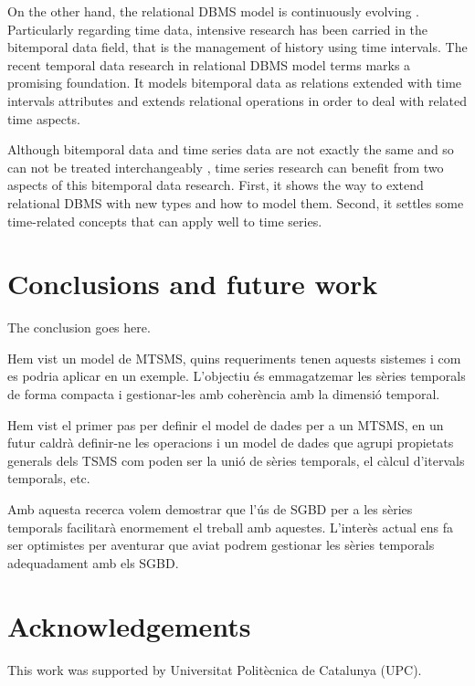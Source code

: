 \documentclass{scrartcl}
\begin{document}
On the other hand, the relational DBMS model is continuously evolving
. Particularly regarding time data,
intensive research has been carried in the bitemporal data field, that
is the management of history using time intervals. 
The recent temporal data research in relational DBMS model terms
\cite{ddl02} marks a promising foundation. It models bitemporal data
as relations extended with time intervals attributes and extends
relational operations in order to deal with related time aspects.

Although bitemporal data and time series data are not exactly the same
and so can not be treated interchangeably ,
time series research can benefit from two aspects of this bitemporal
data research. First, it shows the way to extend relational DBMS with
new types and how to model them. Second, it settles some time-related
concepts that can apply well to time series.






\section{Conclusions and future work} 
The conclusion goes here.

Hem vist un model de MTSMS, quins requeriments tenen aquests sistemes i com es podria aplicar en un exemple. L'objectiu és emmagatzemar les sèries temporals de forma compacta i gestionar-les amb coherència amb la dimensió temporal. 

Hem vist el primer pas per definir el model de dades per a un MTSMS, en un futur caldrà definir-ne les operacions i un model de dades que agrupi propietats generals dels TSMS com poden ser la unió de sèries temporals, el càlcul d'itervals temporals, etc.

Amb aquesta recerca volem demostrar que l'ús de SGBD per a les sèries temporals facilitarà enormement el treball amb aquestes.
L'interès actual ens fa ser optimistes per aventurar que aviat podrem gestionar les sèries temporals adequadament amb els SGBD.



\section*{Acknowledgements}

This work was supported by Universitat Polit\`{e}cnica de Catalunya (UPC).
\end{document}
